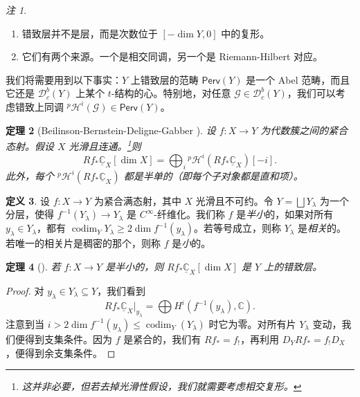 \documentclass{amsart}
\newtheorem{thm}{定理}[section]
\theoremstyle{definition}
\newtheorem{defn}[thm]{定义}
\theoremstyle{remark}
\newtheorem{rmks}[thm]{注}
\theoremstyle{plain}
\theoremstyle{definition}
\theoremstyle{remark}
\newcommand{\C}{\mathbb{C}}
\newcommand{\mc}[1]{\mathcal{#1}}
\newcommand{\on}[1]{\operatorname{#1}}
\newcommand{\ms}[1]{\mathsf{#1}}
\newcommand{\ul}[1]{\underline{#1}}
\newcommand{\1}{\mathbf{1}}
\newcommand{\2}{\mathbf{2}}
\newcommand{\3}{\mathbf{3}}
\begin{document}
\begin{rmks}\leavevmode
    \begin{enumerate}
        \item 错致层并不是层，而是次数位于 \([-\dim Y, 0]\) 中的复形。
        \item 它们有两个来源。一个是相交同调，另一个是 Riemann-Hilbert 对应。
    \end{enumerate}
\end{rmks}

我们将需要用到以下事实：\(Y\) 上错致层的范畴 \(\ms{Perv}(Y)\) 是一个 Abel 范畴，而且它还是 \(\mc{D}_c^b(Y)\) 上某个 \(t\)-结构的心。特别地，对任意 \(\mc{G} \in \mc{D}_c^b (Y)\)，我们可以考虑错致上同调 \(^p\mc{H}^i(\mc{G}) \in \ms{Perv}(Y)\)。

\begin{thm}[Beilinson-Bernstein-Deligne-Gabber {\cite{BBD1982}}]
    设 \(f \colon X \to Y\) 为代数簇之间的紧合态射。假设 \(X\) 光滑且连通。\footnote{这并非必要，但若去掉光滑性假设，我们就需要考虑相交复形。}则
    \[ R f_* \ul{\C}_X [\dim X] = \bigoplus_{i} {^p\mc{H}^i}(R f_* \ul{\C}_X)[-i]. \]
    此外，每个 \(^p\mc{H}^i (R f_* \ul{\C}_X)\) 都是半单的（即每个子对象都是直和项）。
\end{thm}

\begin{defn}
    设 \(f \colon X \to Y\) 为紧合满态射，其中 \(X\) 光滑且不可约。令 \(Y = \bigsqcup Y_{\lambda}\) 为一个分层，使得 \(f^{-1}(Y_{\lambda}) \to Y_{\lambda}\) 是 \(C^{\infty}\)-纤维化。我们称 \(f\) 是\textit{半小}的，如果对所有 \(y_{\lambda} \in Y_{\lambda}\)，都有 \(\on{codim}_Y Y_{\lambda} \geq 2 \dim f^{-1} (y_{\lambda})\)。若等号成立，则称 \(Y_{\lambda}\) 是\textit{相关}的。若唯一的相关片是稠密的那个，则称 \(f\) 是\textit{小}的。
\end{defn}

\begin{thm}[{\cite{DeCataldoMigliorini2002}}]
    若 \(f \colon X \to Y\) 是半小的，则 \(R f_* \ul{\C}_X [\dim X]\) 是 \(Y\) 上的错致层。
\end{thm}

\begin{proof}
    对 \(y_{\lambda} \in Y_{\lambda} \subseteq Y\)，我们看到
    \[ R f_* \ul{\C}_X |_{y_{\lambda}} = \bigoplus H^i (f^{-1}(y_{\lambda}), \C). \]
    注意到当 \(i > 2 \dim f^{-1}(y_{\lambda}) \leq \on{codim}_Y (Y_{\lambda})\) 时它为零。对所有片 \(Y_{\lambda}\) 变动，我们便得到支集条件。因为 \(f\) 是紧合的，我们有 \(R f_* = f_!\)，再利用 \(D_Y R f_* = f_! D_X\)，便得到余支集条件。
\end{proof}
\end{document}
